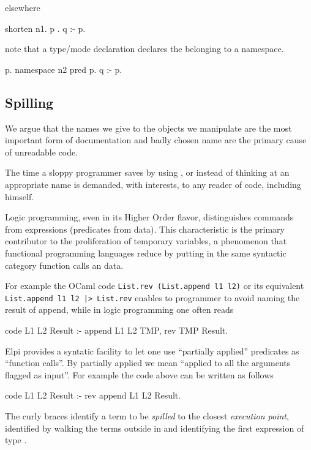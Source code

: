 \documentclass[a4paper, 11pt]{book}
\begin{document}
elsewhere

\begin{elpicode}
shorten n1.{ p }.
q :- p.
\end{elpicode}

note that a type/mode declaration declares the belonging to a namespace.

\begin{elpicode}
p.
namespace n2 {
  pred p.
  q :- p.
}
\end{elpicode}

\subsection{Spilling}

We argue that the names we give to the objects we manipulate
are the most important form of documentation and badly chosen
name are the primary cause of unreadable code.

The time a sloppy programmer saves by using , 
or  instead of thinking at an appropriate name is
demanded, with interests, to any reader of code, including himself.

Logic programming, even in its Higher Order flavor, distinguishes
commands from expressions (predicates from data). This characteristic
is the primary contributor to the proliferation of temporary
variables, a phenomenon that functional programming languages
reduce by putting in the same syntactic category function calls an
data. 

For example the OCaml code \texttt{List.rev (List.append l1 l2)}
or its equivalent \texttt{List.append l1 l2 |> List.rev} enables
to programmer to avoid naming the result of append, while in logic
programming one often reads

\begin{elpicode}
code L1 L2 Result :- append L1 L2 TMP, rev TMP Result.
\end{elpicode}

Elpi provides a syntatic facility to let one use
``partially applied'' predicates as ``function calls''.
By partially applied we mean ``applied to all the arguments flagged as input''.
For example the code above can be written as follows

\begin{elpicode}
code L1 L2 Result :- rev {append L1 L2} Result.
\end{elpicode}

The curly braces identify a term to be \emph{spilled} to the closest
\emph{execution point}, identified by walking the terms outside in and
identifying the first expression of type .
\end{document}
